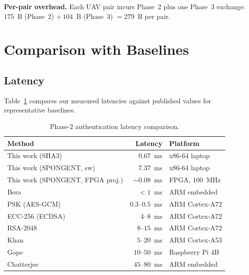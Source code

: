 \documentclass[journal,a4paper,10pt]{IEEEtran}
\begin{document}
\textbf{Per-pair overhead.} Each UAV pair incurs Phase~2 plus one
Phase~3 exchange: $175$~B (Phase~2) $+\,104$~B (Phase~3)
$= 279$~B per pair.


\section{Comparison with Baselines}
\label{sec:comparison}

\subsection{Latency}
Table~\ref{tab:latency_comparison} compares our measured latencies
against published values for representative baselines.

\begin{table}[t]
\centering
\caption{Phase-2 authentication latency comparison.}
\label{tab:latency_comparison}
\begin{tabular}{@{}lrl@{}}
\toprule
\textbf{Method} & \textbf{Latency} & \textbf{Platform} \\
\midrule
This work (SHA3)                            & $0.67$~ms        & x86-64 laptop \\
This work (SPONGENT, sw)                    & $7.37$~ms        & x86-64 laptop \\
This work (SPONGENT, FPGA proj.)            & $\sim 0.08$~ms   & FPGA, $100$~MHz \\
Bera \cite{peer2peer_auth}                  & $<\!1$~ms        & ARM embedded \\
PSK (AES-GCM)                               & $0.3$--$0.5$~ms  & ARM Cortex-A72 \\
ECC-256 (ECDSA)                             & $4$--$8$~ms      & ARM Cortex-A72 \\
RSA-2048                                    & $8$--$15$~ms     & ARM Cortex-A72 \\
Khan \cite{puf_6g_uav}                      & $5$--$20$~ms     & ARM Cortex-A53 \\
Gope \cite{puf_lightweight_uav}             & $10$--$50$~ms    & Raspberry Pi 4B \\
Chatterjee \cite{puf_uav_cross_domain}      & $45$--$80$~ms    & ARM embedded \\
\bottomrule
\end{tabular}
\end{table}
\end{document}
